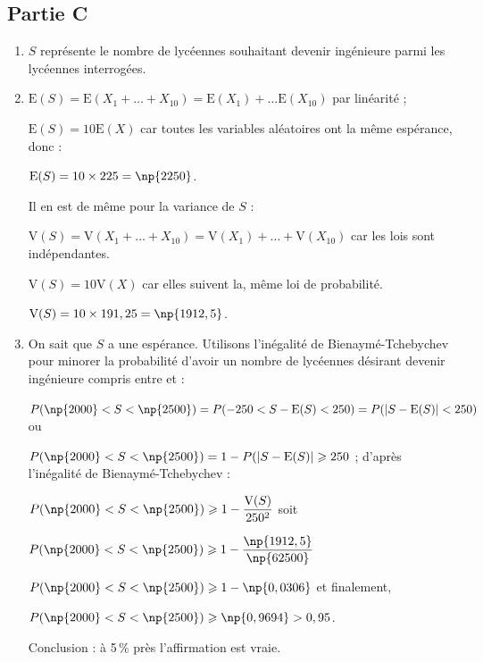 \subsection*{Partie C}
\begin{enumerate}
	\item $S$ représente le nombre de lycéennes souhaitant devenir ingénieure parmi les  lycéennes interrogées.

	\item $\mathrm{E}(S) = \mathrm{E}(X_1 + \ldots + X_{10}) = \mathrm{E}(X_1) + \ldots \mathrm{E}(X_{10})$ par linéarité ;

	$\mathrm{E}(S) = 10\mathrm{E}(X) $ car toutes les variables aléatoires ont la même espérance, donc :

	$\mathrm{E}(S) = 10 \times 225 = \np{2250}$.

	Il en est de même pour la variance de $S$ :

	$\mathrm{V}(S) = \mathrm{V}(X_1 + \ldots + X_{10}) = \mathrm{V}(X_1) + \ldots + \mathrm{V}(X_{10})$ car les lois sont indépendantes.

	$\mathrm{V}(S) = 10\mathrm{V}(X)$ car elles suivent la, même loi de probabilité.

	$\mathrm{V}(S) = 10 \times 191,25 = \np{1912,5}$.

	\item On sait que $S$ a une espérance. Utilisons l'inégalité de Bienaymé-Tchebychev pour minorer la probabilité  d'avoir un nombre de lycéennes désirant devenir ingénieure compris entre  et  :

	$P(\np{2000} < S < \np{2500})  = P(- 250 <S - \mathrm{E}(S) < 250) = P(|S - \mathrm{E}(S)| < 250)$ ou

	$P(\np{2000} < S < \np{2500})  = 1 - P(|S - \mathrm{E}(S)| \geqslant 250$ ;
	d'après l'inégalité de Bienaymé-Tchebychev :

	$P(\np{2000} < S < \np{2500}) \geqslant 1 - \dfrac{\mathrm{V}(S)}{250^2}$ soit

	$P(\np{2000} < S < \np{2500}) \geqslant 1 - \dfrac{\np{1912,5}}{\np{62500}}$

	$P(\np{2000} < S < \np{2500}) \geqslant 1 - \np{0,0306}$ et finalement,

	$P(\np{2000} < S <\np{2500}) \geqslant \np{0,9694} > 0,95$.

	Conclusion : à 5\,\% près l'affirmation est vraie.

\end{enumerate}
